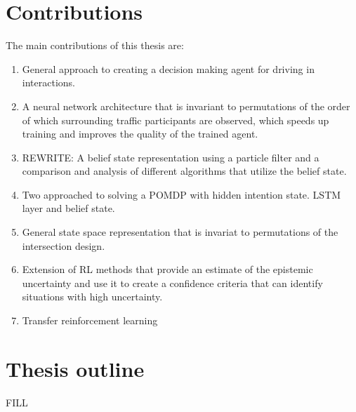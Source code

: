 \section{Contributions}
The main contributions of this thesis are:
\begin{enumerate}
	\item General approach to creating a decision making agent for driving in interactions. 
	\item A neural network architecture that is invariant to permutations of the order of which surrounding traffic participants are observed, which speeds up training and improves the quality of the trained agent. 
	\item REWRITE: A belief state representation using a particle filter and a comparison and analysis of different algorithms that utilize the belief state. 
	\item Two approached to solving a POMDP with hidden intention state. LSTM layer and belief state. 
	\item General state space representation that is invariat to permutations of the intersection design. 
	\item Extension of RL methods that provide an estimate of the epistemic uncertainty and use it to create a confidence criteria that can identify situations with high uncertainty. 
	\item Transfer reinforcement learning

\end{enumerate}


\section{Thesis outline}
FILL


